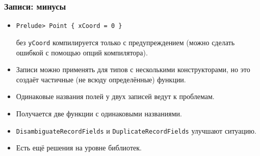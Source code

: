 \documentclass[10pt]{beamer}
\begin{document}
\begin{frame}[fragile]
\frametitle{Записи: минусы}\hypertarget{rec2}{}
\hyperlink{rec1}{}
\begin{itemize}
    \item
\begin{lstlisting}
Prelude> Point { xCoord = 0 }
\end{lstlisting}
    \pause
    без \lstinline|yCoord| компилируется только с предупреждением (можно сделать ошибкой с помощью опций компилятора).
    \pause 
    \item Записи можно применять для типов с несколькими конструкторами, но это создаёт частичные (не всюду определённые) функции.
    \pause
    \item Одинаковые названия полей у двух записей ведут к проблемам. 
    \pause
    \item Получается две функции с одинаковыми названиями.
    \item \lstinline|DisambiguateRecordFields| и \lstinline|DuplicateRecordFields| улучшают ситуацию.
    \pause
    \item Есть ещё решения на уровне библиотек.
\end{itemize}
\end{frame}
\end{document}
